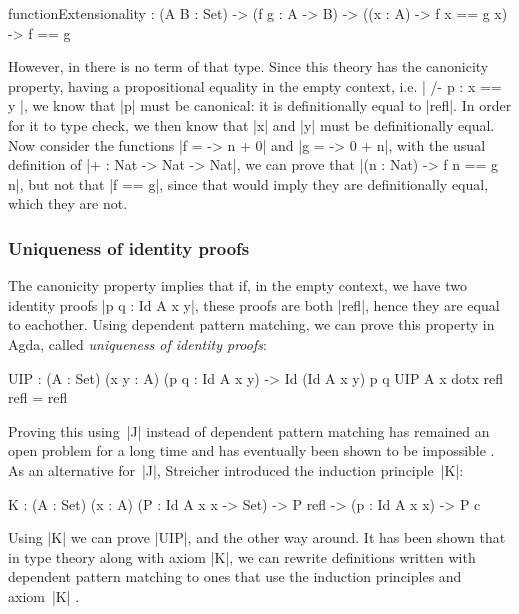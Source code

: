 \begin{code}
  functionExtensionality  :   (A B : Set) -> (f g : A -> B)
                          ->  ((x : A) -> f x == g x)
                          ->  f == g

\end{code}

However, in \MLTT there is no term of that type. Since this theory has
the canonicity property, having a propositional equality in the empty
context, i.e. | /- p : x == y |, we know that |p| must be canonical: it is
definitionally equal to |refl|. In order for it to type check, we then
know that |x| and |y| must be definitionally equal. Now consider the
functions |f = \n -> n + 0| and |g = \n -> 0 + n|, with the usual
definition of |+ : Nat -> Nat -> Nat|, we can prove that |(n : Nat)
-> f n == g n|, but not that |f == g|, since that would imply they are
definitionally equal, which they are not.

\subsubsection{Uniqueness of identity proofs}
\label{sec:uip}

The canonicity property implies that if, in the empty context, we have
two identity proofs |p q : Id A x y|, these proofs are both |refl|,
hence they are equal to eachother. Using dependent pattern matching,
we can prove this property in Agda, called \emph{uniqueness of identity
  proofs}:

\begin{code}
UIP : (A : Set) (x y : A) (p q : Id A x y) -> Id (Id A x y) p q
UIP A x dotx refl refl = refl
\end{code}

Proving this using~|J| instead of dependent pattern matching has remained an
open problem for a long time and has eventually been shown to be impossible
\citep{groupoidinterpretation}. As an alternative for~|J|, Streicher
introduced the induction principle~|K|:

\begin{code}
  K  :   (A : Set) (x : A) (P : Id A x x -> Set)
     ->  P refl
     ->  (p : Id A x x)
     ->  P c
\end{code}

Using |K| we can prove |UIP|, and the other way around. It has been
shown that in type theory along with axiom |K|, we can rewrite
definitions written with dependent pattern matching to ones that use
the induction principles and axiom~|K|
\citep{eliminatingdependentpatternmatching}.

